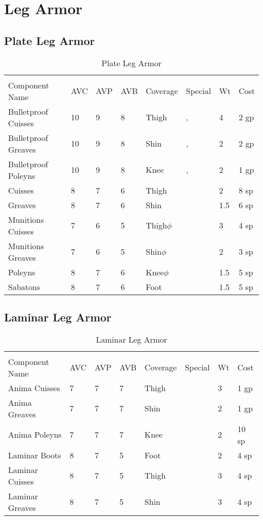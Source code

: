 \documentclass[oneside,11pt,english]{book}
\begin{document}
\section{Leg Armor}
\subsection{Plate Leg Armor}
\begin{longtabu} to 
  \captionsetup{textformat=empty, labelformat=blank}
  \caption{Plate Leg Armor} \vspace{-15pt}
  \label{tab:Plate Leg Armor}\\
  Component Name&AVC&AVP&AVB& Coverage& Special& Wt&Cost\\\toprule
  Bulletproof Cuisses& 10& 9& 8& Thigh& , & 4& 2 gp\\
  Bulletproof Greaves& 10& 9& 8& Shin& , & 2& 2 gp\\
  Bulletproof Poleyns& 10& 9& 8& Knee& , & 2& 1 gp\\
  Cuisses& 8& 7& 6& Thigh& & 2& 8 sp\\
  Greaves& 8& 7& 6& Shin& & 1.5& 6 sp\\
  Munitions Cuisses& 7& 6& 5& Thigh\hyperref[sec:Weak Spots]{$\phi$}& & 3& 4 sp\\
  Munitions Greaves& 7& 6& 5& Shin\hyperref[sec:Weak Spots]{$\phi$}& & 2& 3 sp\\
  Poleyns& 8& 7& 6& Knee\hyperref[sec:Weak Spots]{$\phi$}& & 1.5& 5 sp\\
  Sabatons& 8& 7& 6& Foot& & 1.5& 5 sp\\
\end{longtabu}
\subsection{Laminar Leg Armor}
\begin{longtabu} to 
  \captionsetup{textformat=empty, labelformat=blank}
  \caption{Laminar Leg Armor} \vspace{-15pt}
  \label{tab:Laminar Leg Armor}\\
  Component Name&AVC&AVP&AVB& Coverage& Special& Wt&Cost\\\toprule
  Anima Cuisses& 7& 7& 7& Thigh& & 3& 1 gp\\
  Anima Greaves& 7& 7& 7& Shin& & 2& 1 gp\\
  Anima Poleyns& 7& 7& 7& Knee& & 2& 10 sp\\
  Laminar Boots& 8& 7& 5& Foot& & 2& 4 sp\\
  Laminar Cuisses& 8& 7& 5& Thigh& & 3& 4 sp\\
  Laminar Greaves& 8& 7& 5& Shin& & 3& 4 sp\\
\end{longtabu}
\end{document}
